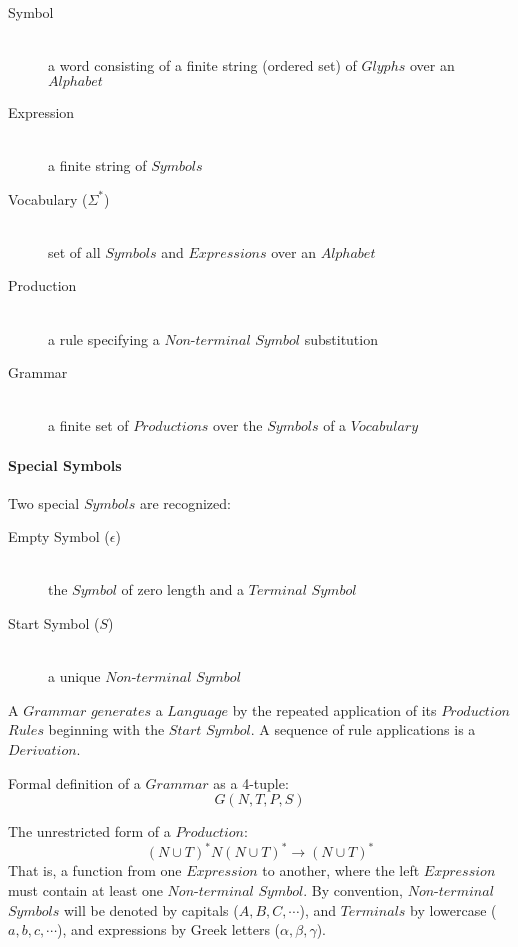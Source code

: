 \documentclass{article}
\begin{document}
    \begin{description}

    \item[Symbol] \hfill \\
    a word consisting of a finite string (ordered set) of $Glyphs$
    over an $Alphabet$

    \item[Expression] \hfill \\
    a finite string of $Symbols$

    \item[Vocabulary ($\Sigma^{*}$)] \hfill \\
    set of all $Symbols$ and $Expressions$ over an $Alphabet$

    \item[Production] \hfill \\
    a rule specifying a $Non$-$terminal$ $Symbol$ substitution

    \item[Grammar] \hfill \\
    a finite set of $Productions$ over the $Symbols$ of a $Vocabulary$

    \end{description}

\paragraph{Special Symbols}

Two special $Symbols$ are recognized:

    \begin{description}

    \item[Empty Symbol ($\epsilon$)] \hfill \\
    the $Symbol$ of zero length and a $Terminal$ $Symbol$

    \item[Start Symbol ($S$)] \hfill \\
    a unique $Non$-$terminal$ $Symbol$

    \end{description}

A $Grammar$ $generates$ a $Language$ by the repeated application of
its $Production$ $Rules$ beginning with the $Start$ $Symbol$. A
sequence of rule applications is a $Derivation$.

Formal definition of a $Grammar$ as a 4-tuple:
\[
    G(N,T,P,S)
\]

The unrestricted form of a $Production$:
\[
    (N \cup T)^*N(N \cup T)^* \rightarrow (N \cup T)^*
\]
That is, a function from one $Expression$ to another, where the left
$Expression$ must contain at least one $Non$-$terminal$ $Symbol$. By
convention, $Non$-$terminal$ $Symbols$ will be denoted by capitals
($A,B,C,\cdots$), and $Terminals$ by lowercase ($a,b,c,\cdots$), and
expressions by Greek letters ($\alpha,\beta,\gamma$).
\end{document}

